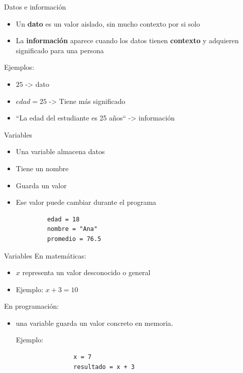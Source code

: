 \documentclass{beamer}
\begin{document}
    \begin{frame}{Datos e información}
        \begin{itemize}
            \item Un \textbf{dato} es un valor aislado, sin mucho contexto por si solo
            \item La \textbf{información} aparece cuando los datos tienen \textbf{contexto} y adquieren significado para una persona 
        \end{itemize}
        Ejemplos:
        \begin{itemize}
            \item $25$ -> dato
            \item $edad = 25$ -> Tiene más significado
            \item ``La edad del estudiante es 25 años`` -> información
        \end{itemize}
    \end{frame}

    \begin{frame}[fragile,t]{Variables}
        \begin{itemize}
            \item Una variable almacena datos
            \item Tiene un nombre
            \item Guarda un valor
            \item Ese valor puede cambiar durante el programa
        \end{itemize}
        \centering
        \begin{verbatim}
            edad = 18
            nombre = "Ana"
            promedio = 76.5
        \end{verbatim}
    \end{frame}

    \begin{frame}[fragile,t]{Variables}
        En matemáticas:
        \begin{itemize}
            \item $x$ representa un valor desconocido o general
            \item Ejemplo: $x + 3 = 10$
        \end{itemize}
        En programación:
        \begin{itemize}
            \item una variable guarda un valor concreto en memoria.
            
            Ejemplo:
            
            \begin{verbatim}
                x = 7
                resultado = x + 3
            \end{verbatim}
        \end{itemize}
    \end{frame}
\end{document}
